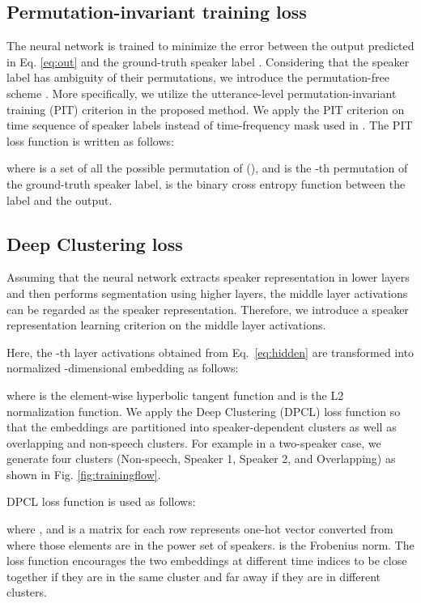 \documentclass[a4paper]{article}
\begin{document}
\subsection{Permutation-invariant training loss}

The neural network is trained to minimize the error between the output  predicted in Eq. \ref{eq:out} and the ground-truth speaker label .
Considering that the speaker label has ambiguity of their permutations, we introduce the permutation-free scheme \cite{Hershey2016, Yu2017}. More specifically, we utilize the utterance-level permutation-invariant training (PIT) criterion \cite{Kolbak2017} in the proposed method.
We apply the PIT criterion on time sequence of speaker labels instead of time-frequency mask used in \cite{Kolbak2017}.
The PIT loss function is written as follows:

where  is a set of all the possible permutation of (),
and  is the -th permutation of the ground-truth speaker label,  is the binary cross entropy function between the label and the output.


\subsection{Deep Clustering loss}

Assuming that the neural network extracts speaker representation in lower layers and then performs segmentation using higher layers, the middle layer activations can be regarded as the speaker representation.
Therefore, we introduce a speaker representation learning criterion on the middle layer activations.

Here, the -th layer activations  obtained from Eq.~\ref{eq:hidden} are transformed into normalized  -dimensional embedding  as follows:

where  is the element-wise hyperbolic tangent function and  is the L2 normalization function.
We apply the Deep Clustering (DPCL) loss function \cite{Hershey2016} so that the embeddings are partitioned into speaker-dependent clusters as well as overlapping and non-speech clusters.
For example in a two-speaker case, we generate four clusters (Non-speech, Speaker 1, Speaker 2, and Overlapping) as shown in Fig. \ref{fig:trainingflow}.

DPCL loss function \cite{Hershey2016} is used as follows:

where , and  is a matrix for each row represents one-hot vector converted from  where those elements are in the power set of speakers.
 is the Frobenius norm.
The loss function encourages the two embeddings at different time indices to be close together if they are in the same cluster and far away if they are in different clusters.
\end{document}
